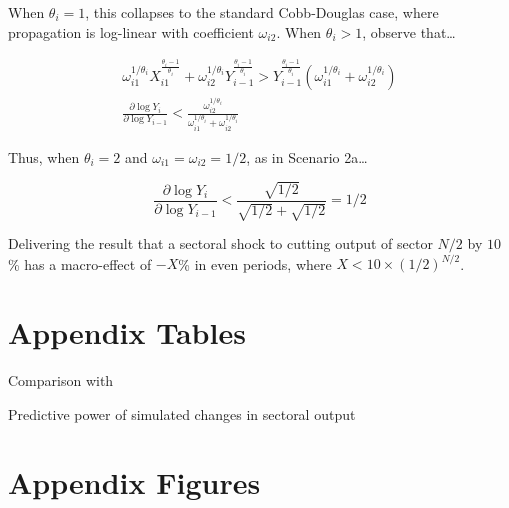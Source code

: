 \documentclass[11pt]{article}
\begin{document}
When $\theta_i=1$, this collapses to the standard Cobb-Douglas case, where propagation is log-linear with coefficient $\omega_{i2}$. When $\theta_i > 1$, observe that\dots

\[
\begin{aligned}
\omega_{i1}^{1/\theta_i} X_{i1}^{\frac{\theta_i - 1}{\theta_i}} + \omega_{i2}^{1/\theta_i} Y_{i-1}^{\frac{\theta_i - 1}{\theta_i}} > Y_{i-1}^{\frac{\theta_i - 1}{\theta_i}}(\omega_{i1}^{1/\theta_i} + \omega_{i2}^{1/\theta_i}) \\
\frac{\partial \log Y_i}{\partial \log Y_{i-1}} < \frac{\omega_{i2}^{1/\theta_i}}{\omega_{i1}^{1/\theta_i} + \omega_{i2}^{1/\theta_i} }
\end{aligned}
\] 

Thus, when $\theta_i = 2$ and $\omega_{i1} = \omega_{i2} = 1/2$, as in Scenario 2a\dots

\[
\frac{\partial \log Y_{i}}{\partial \log Y_{i-1}} < \frac{\sqrt{1/2}}{\sqrt{1/2} + \sqrt{1/2}} = 1/2
\]

Delivering the result that a sectoral shock to cutting output of sector $N/2$ by $10$\% has a macro-effect of $-X$\% in even periods, where $X < 10 \times (1/2)^{N/2}$.


\pagebreak

\section*{Appendix Tables}

\begin{table}[!h]
    \centering 
    \caption{Comparison with \citet{atalayHowImportantAre2017}}
    \label{tab:atalay_comparison_subset}
    
\end{table}

\begin{table}[!h]
    \centering
    \caption{Predictive power of simulated changes in sectoral output}
    
    \label{tab:sector_output_prediction}
\end{table}

\pagebreak 

\section*{Appendix Figures}
\end{document}
